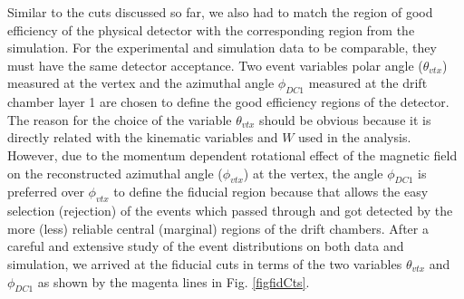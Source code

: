 Similar to the cuts discussed so far, we also had to match the region of good efficiency of the physical detector with the corresponding region from the simulation. For the experimental and simulation data to be comparable, they must have the same detector acceptance. %
Two event variables polar angle ($\theta_{vtx}$) measured at the vertex and the azimuthal angle $\phi_{DC1}$ measured at the drift chamber layer 1 are chosen to define the good efficiency regions of the detector. The reason for the choice of the variable $\theta_{vtx}$ should be obvious because it is directly related with the kinematic variables \qsqs and $W$ used in the analysis. However, due to the momentum dependent rotational effect of the magnetic field on the reconstructed azimuthal angle ($\phi_{vtx}$) at the vertex, the angle $\phi_{DC1}$ is preferred over $\phi_{vtx}$ to define the fiducial region because that allows the easy selection (rejection) of the events which passed through and got detected by the more (less) reliable central (marginal) regions of the drift chambers. %
After a careful and extensive study of the event distributions on both data and simulation, we arrived at the fiducial cuts in terms of the two variables $\theta_{vtx}$ and $\phi_{DC1}$ as shown by the magenta lines in Fig. \ref{figfidCts}.%

%
%   
%
%
%
%
%
%   
%
%
%   


